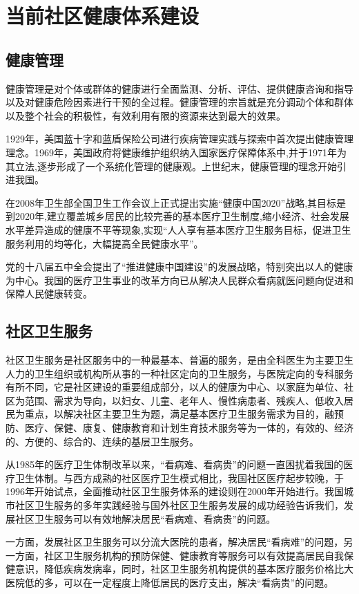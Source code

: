 \section{当前社区健康体系建设}
\subsection{健康管理}
健康管理是对个体或群体的健康进行全面监测、分析、评估、提供健康咨询和指导以及对健康危险因素进行干预的全过程。健康管理的宗旨就是充分调动个体和群体以及整个社会的积极性，有效利用有限的资源来达到最大的效果。

1929年，美国蓝十字和蓝盾保险公司进行疾病管理实践与探索中首次提出健康管理理念。1969年，美国政府将健康维护组织纳入国家医疗保障体系中,并于1971年为其立法,逐步形成了一个系统化管理的健康观。上世纪末，健康管理的理念开始引进我国。

在2008年卫生部全国卫生工作会议上正式提出实施“健康中国2020”战略,其目标是到2020年,建立覆盖城乡居民的比较完善的基本医疗卫生制度,缩小经济、社会发展水平差异造成的健康不平等现象,实现“人人享有基本医疗卫生服务目标，促进卫生服务利用的均等化，大幅提高全民健康水平”。

党的十八届五中全会提出了“推进健康中国建设”的发展战略，特别突出以人的健康为中心。我国的医疗卫生事业的改革方向已从解决人民群众看病就医问题向促进和保障人民健康转变。

\subsection{社区卫生服务}
社区卫生服务是社区服务中的一种最基本、普遍的服务，是由全科医生为主要卫生人力的卫生组织或机构所从事的一种社区定向的卫生服务，与医院定向的专科服务有所不同，它是社区建设的重要组成部分，以人的健康为中心、以家庭为单位、社区为范围、需求为导向，以妇女、儿童、老年人、慢性病患者、残疾人、低收入居民为重点，以解决社区主要卫生为题，满足基本医疗卫生服务需求为目的，融预防、医疗、保健、康复、健康教育和计划生育技术服务等为一体的，有效的、经济的、方便的、综合的、连续的基层卫生服务。

从1985年的医疗卫生体制改革以来，“看病难、看病贵”的问题一直困扰着我国的医疗卫生体制。与西方成熟的社区医疗卫生模式相比，我国社区医疗起步较晚，于1996年开始试点，全面推动社区卫生服务体系的建设则在2000年开始进行。我国城市社区卫生服务的多年实践经验与国外社区卫生服务发展的成功经验告诉我们，发展社区卫生服务可以有效地解决居民“看病难、看病贵”的问题。

一方面，发展社区卫生服务可以分流大医院的患者，解决居民“看病难”的问题，另一方面，社区卫生服务机构的预防保健、健康教育等服务可以有效提高居民自我保健意识，降低疾病发病率，同时，社区卫生服务机构提供的基本医疗服务价格比大医院低的多，可以在一定程度上降低居民的医疗支出，解决“看病贵”的问题。

